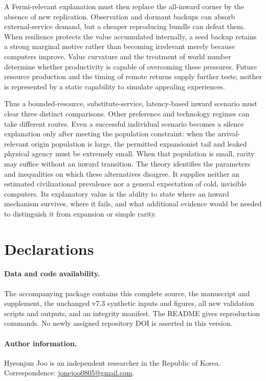 \documentclass[11pt,a4paper]{article}
\theoremstyle{definition}\newtheorem{definition}{Definition}
\begin{document}
A Fermi-relevant explanation must then replace the all-inward corner by
the absence of new replication. Observation and dormant backups can absorb
external-service demand, but a cheaper reproducing bundle can defeat them.
When resilience protects the value accumulated internally, a seed backup
retains a strong marginal motive rather than becoming irrelevant merely
because computers improve. Value curvature and the treatment of world
number determine whether productivity is capable of overcoming these
pressures. Future resource production and the timing of remote returns
supply further tests; neither is represented by a static capability to
simulate appealing experiences.

Thus a bounded-resource, substitute-service, latency-based inward scenario
must clear three distinct comparisons. Other preference and technology
regimes can take different routes. Even a successful individual scenario
becomes a silence explanation only after meeting the population constraint:
when the arrival-relevant origin population is large, the permitted
expansionist tail and leaked physical agency must be extremely small.
When that population is small, rarity may suffice without an inward
transition. The theory identifies the parameters and inequalities on
which these alternatives disagree. It supplies neither an estimated
civilizational prevalence nor a general expectation of cold, invisible
computers. Its explanatory value is the ability to state where an inward
mechanism survives, where it fails, and what additional evidence would be
needed to distinguish it from expansion or simple rarity.

\section*{Declarations}
\paragraph{Data and code availability.}
The accompanying package contains this complete source, the manuscript and
supplement, the unchanged v7.3 synthetic inputs and figures, all new validation
scripts and outputs, and an integrity manifest. The README gives reproduction
commands. No newly assigned repository DOI is asserted in this version.
\paragraph{Author information.}
Hyeonjun Joo is an independent researcher in the Republic of Korea.
Correspondence: \href{mailto:jonejoo0805@gmail.com}{jonejoo0805@gmail.com}.
\end{document}
